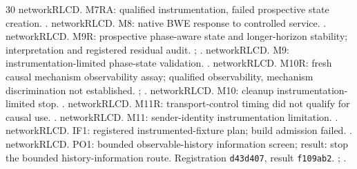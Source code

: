 \begin{thebibliography}{30}
 networkRLCD. M7RA: qualified instrumentation, failed prospective
state creation. .
 networkRLCD. M8: native BWE response to controlled service.
.
 networkRLCD. M9R: prospective phase-aware state and longer-horizon
stability; interpretation and registered residual audit.
;
.
 networkRLCD. M9: instrumentation-limited phase-state validation.
.
 networkRLCD. M10R: fresh causal mechanism observability assay;
qualified observability, mechanism discrimination not established.
;
.
 networkRLCD. M10: cleanup instrumentation-limited stop.
.
 networkRLCD. M11R: transport-control timing did not qualify for
causal use. .
 networkRLCD. M11: sender-identity instrumentation limitation.
.
 networkRLCD. IF1: registered instrumented-fixture plan; build
admission failed. .
 networkRLCD. PO1: bounded observable-history information screen;
result: stop the bounded history-information route. Registration \texttt{d43d407},
result \texttt{f109ab2}.
;
.
\end{thebibliography}
